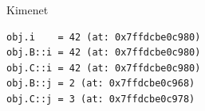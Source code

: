\begin{frame}
    \begin{exampleblock}{}
        \scriptsize
        \vspace{-.2cm}
        
        \vspace{-.2cm}
    \end{exampleblock}
\end{frame}

\begin{frame}[fragile]
    \begin{exampleblock}{}
        \scriptsize
        \vspace{-.2cm}
        
        \vspace{-.2cm}
    \end{exampleblock}
    \begin{block}{Kimenet}
        \footnotesize
        \vspace{-.3cm}
        \begin{verbatim}
obj.i    = 42 (at: 0x7ffdcbe0c980)
obj.B::i = 42 (at: 0x7ffdcbe0c980)
obj.C::i = 42 (at: 0x7ffdcbe0c980)
obj.B::j = 2 (at: 0x7ffdcbe0c968)
obj.C::j = 3 (at: 0x7ffdcbe0c978)
\end{verbatim}
        \vspace{-.3cm}
    \end{block}
\end{frame}
